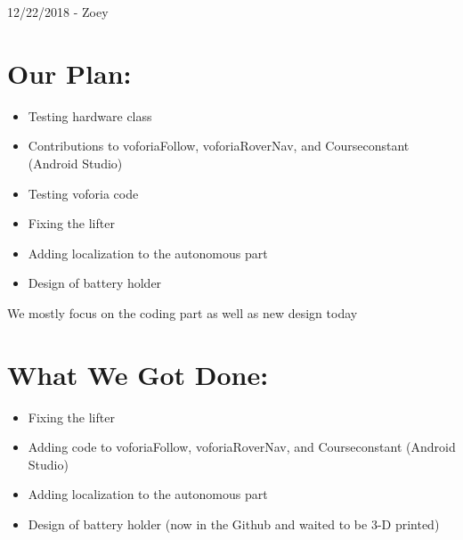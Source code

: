 \documentclass[12pt]{article}
\begin{document}
\newpage
\setcounter{section}{0}

12/22/2018 - Zoey

\section{Our Plan:} %
\begin{itemize} 
	\item Testing hardware class 
	\item Contributions to voforiaFollow, voforiaRoverNav, and Courseconstant (Android Studio)
	\item Testing voforia code
	\item Fixing the lifter
	\item Adding localization to the autonomous part
	\item Design of battery holder 
\end{itemize}

We mostly focus on the coding part as well as new design today

\section{What We Got Done:} %
\begin{itemize}

	\item	 Fixing the lifter
	\item Adding code to voforiaFollow, voforiaRoverNav, and Courseconstant (Android Studio)
	\item Adding localization to the autonomous part
	\item Design of battery holder (now in the Github and waited to be 3-D printed)
\end{itemize}

\end{document}
